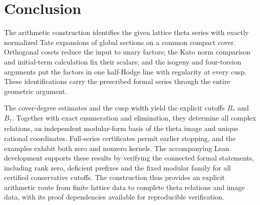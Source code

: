 \documentclass[11pt]{article}
\theoremstyle{remark}\newtheorem{remark}[theorem]{Remark}
\begin{document}
\section{Conclusion}
The arithmetic construction identifies the given lattice theta series with
exactly normalized Tate expansions of global sections on a common compact
cover. Orthogonal cosets reduce the input to unary factors; the Kato norm
comparison and initial-term calculation fix their scalars; and the isogeny
and four-torsion arguments put the factors in one half-Hodge line with
regularity at every cusp. These identifications carry the prescribed
formal series through the entire geometric argument.

The cover-degree estimates and the cusp width yield the explicit cutoffs
$B_*$ and $B_\dagger$. Together with exact enumeration and elimination,
they determine all complex relations, an independent modular-form basis
of the theta image and unique rational coordinates. Full-series
certificates permit earlier stopping, and the examples exhibit both zero
and nonzero kernels. The accompanying Lean development supports these
results by verifying the connected formal statements, including rank zero,
deficient prefixes and the fixed modular family for all certified
conservative cutoffs. The construction thus provides an explicit arithmetic
route from finite lattice data to complete theta relations and image data,
with its proof dependencies available for reproducible verification.
\end{document}

